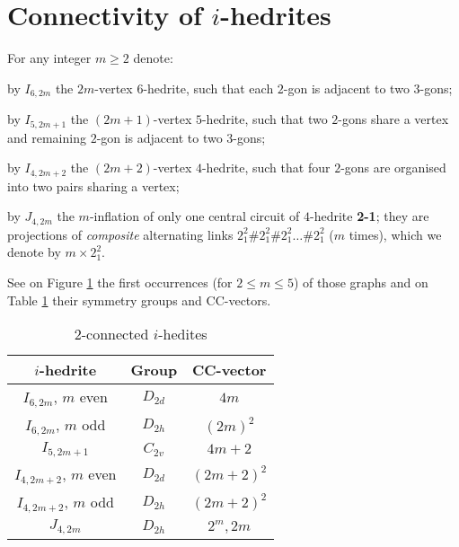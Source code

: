 \documentclass[12pt]{article}
\begin{document}
\section{Connectivity of $i$-hedrites}
For any integer $m\geq 2$ denote:

by $I_{6,2m}$ the $2m$-vertex $6$-hedrite, such that each $2$-gon is adjacent to two $3$-gons;

by $I_{5,2m+1}$ the $(2m+1)$-vertex $5$-hedrite, such that 
two $2$-gons share a vertex and remaining $2$-gon is adjacent
to two $3$-gons;

by $I_{4,2m+2}$ the $(2m+2)$-vertex $4$-hedrite, such that 
four $2$-gons are organised into two pairs sharing a vertex; 

by $J_{4,2m}$ the $m$-inflation of only one central circuit of
$4$-hedrite {\bf 2-1}; they are projections of {\em composite}
alternating links $2^2_1\#2^2_1\#2^2_1\dots\#2^2_1$ ($m$ times),
which we denote by $m\times 2^2_1$.

See on Figure \ref{fig:FamilyIin} the first occurrences
(for $2\leq m\leq 5$) of those graphs and on Table \ref{FundamentalInfo}
their symmetry groups and CC-vectors.

\begin{figure}
\centering
\epsfxsize=100mm
\label{fig:FamilyIin}
\end{figure}

\begin{table}
\begin{center}
\begin{tabular}{||c|c|c||}
\hline\hline
$i$-hedrite            &Group      &CC-vector\\\hline\hline
$I_{6,2m}$, $m$ even   &$D_{2d}$   &$4m$\\\hline
$I_{6,2m}$, $m$ odd    &$D_{2h}$   &$(2m)^2$\\\hline
$I_{5,2m+1}$           &$C_{2v}$   &$4m+2$\\\hline
$I_{4,2m+2}$, $m$ even &$D_{2d}$   &$(2m+2)^2$\\\hline
$I_{4,2m+2}$, $m$ odd  &$D_{2h}$   &$(2m+2)^2$\\\hline
$J_{4,2m}$             &$D_{2h}$   &$2^m, 2m$\\\hline\hline
\end{tabular}
\end{center}
\caption{$2$-connected $i$-hedites}
\label{FundamentalInfo}
\end{table}
\end{document}
